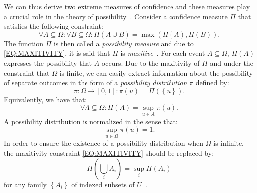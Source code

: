 We can thus derive two extreme measures of confidence and these measures play a crucial role in the theory of possibility~\cite{Dubois88}. Consider a confidence measure $\Pi$ that satisfies the following constraint:
\begin{equation}
\label{EQ:MAXITIVITY}
\forall A\subseteq\Omega:\forall B\subseteq\Omega:\Pi\left(A\cup B\right) = \max\left(\Pi(A),\Pi(B)\right).
\end{equation}
The function $\Pi$ is then called a \emph{possibility measure} and due to \eqref{EQ:MAXITIVITY}, it is said that $\Pi$ is \emph{maxitive}~\cite{Dubois88}. For each event $A\subseteq\Omega$, $\Pi(A)$ expresses the possibility that $A$ occurs. Due to the maxitivity of $\Pi$ and under the constraint that $\Omega$ is finite, we can easily extract information about the possibility of separate outcomes in the form of a \emph{possibility distribution} $\pi$ defined by:
\begin{equation}
\pi:\Omega\rightarrow[0,1]:\pi(u)=\Pi\left(\left\{u\right\}\right).
\end{equation}
Equivalently, we have that:
\begin{equation}
\forall A\subseteq\Omega:\Pi(A)=\sup_{u\in A}\pi (u).
\end{equation}
A possibility distribution is normalized in the sense that:
\begin{equation}
\sup_{u\in\Omega}\pi(u)=1.
\end{equation}
In order to ensure the existence of a possibility distribution when $\Omega$ is infinite, the maxitivity constraint \eqref{EQ:MAXITIVITY} should be replaced by:
\begin{equation}
\Pi\left(\bigcup_{i}A_i\right)=\sup_{i}\Pi\left(A_i\right)
\end{equation}
for any family $\left\{A_i\right\}$ of indexed subsets of $U$~\cite{Nguyen79}.

